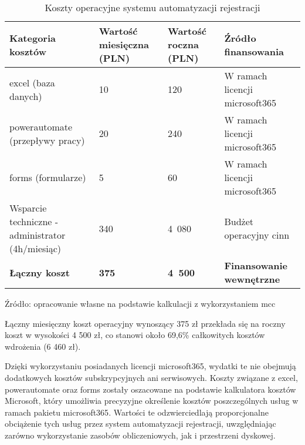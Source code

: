 \begin{table}[ht]
    \centering
    \caption[Koszty operacyjne systemu automatyzacji rejestracji, źródło: opracowanie własne na podstawie kalkulacji z wykorzystaniem \gls{mcc}]{Koszty operacyjne systemu automatyzacji rejestracji}
    \label{tab:koszty_operacyjne_systemu}
    \renewcommand{\arraystretch}{1.3} %
    \begin{tabular}{| p{} | p{} | p{} | p{} |}
        \hline
        \textbf{Kategoria kosztów} & \textbf{Wartość miesięczna (PLN)} & \textbf{Wartość roczna (PLN)} & \textbf{Źródło finansowania} \\
        \hline
        \gls{excel} (baza danych)  & 10 & 120 & W ramach licencji \gls{microsoft365} \\
        \hline
        \gls{powerautomate} (przepływy pracy)  & 20 & 240 & W ramach licencji \gls{microsoft365} \\
        \hline
        \gls{forms} (formularze)  & 5 & 60 & W ramach licencji \gls{microsoft365} \\
        \hline
        Wsparcie techniczne - administrator (4h/miesiąc) & 340 & 4~080 & Budżet operacyjny \gls{cinn} \\
        \hline
        \textbf{Łączny koszt} & \textbf{375} & \textbf{4~500} & \textbf{Finansowanie wewnętrzne} \\
        \hline
    \end{tabular}
    \vspace{0.5em}
    \par\raggedright\footnotesize{Źródło: opracowanie własne na podstawie kalkulacji z wykorzystaniem \gls{mcc}}
\end{table}

Łączny miesięczny koszt operacyjny wynoszący 375 zł przekłada się na roczny koszt w wysokości 4 500 zł, co stanowi około 69,6\% całkowitych kosztów wdrożenia (6 460 zł). 

Dzięki wykorzystaniu posiadanych licencji \gls{microsoft365}, wydatki te nie obejmują dodatkowych kosztów subskrypcyjnych ani serwisowych. Koszty związane z \gls{excel}, \gls{powerautomate} oraz \gls{forms} zostały oszacowane na podstawie kalkulatora kosztów Microsoft, który umożliwia precyzyjne określenie kosztów poszczególnych usług w ramach pakietu \gls{microsoft365}. Wartości te odzwierciedlają proporcjonalne obciążenie tych usług przez system automatyzacji rejestracji, uwzględniając zarówno wykorzystanie zasobów obliczeniowych, jak i przestrzeni dyskowej.


